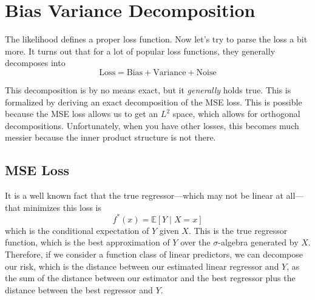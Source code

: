 \section{Bias Variance Decomposition}  

  The likelihood defines a proper loss function. Now let's try to parse the loss a bit more. It turns out that for a lot of popular loss functions, they generally decomposes into 
  \begin{equation}
    \text{Loss} = \text{Bias} + \text{Variance} + \text{Noise}
  \end{equation} 

  This decomposition is by no means exact, but it \textit{generally} holds true. This is formalized by deriving an exact decomposition of the MSE loss. This is possible because the MSE loss allows us to get an $L^2$ space, which allows for orthogonal decompositions. Unfortunately, when you have other losses, this becomes much messier because the inner product structure is not there. 

\subsection{MSE Loss} 

  It is a well known fact that the true regressor---which may not be linear at all---that minimizes this loss is 
  \begin{equation}
    f^\ast (x) = \mathbb{E}[Y \mid X = x]
  \end{equation}
  which is the conditional expectation of $Y$ given $X$. This is the true regressor function, which is the best approximation of $Y$ over the $\sigma$-algebra generated by $X$. Therefore, if we consider a function class of linear predictors, we can decompose our risk, which is the distance between our estimated linear regressor and $Y$, as the sum of the distance between our estimator and the best regressor plus the distance between the best regressor and $Y$. 

